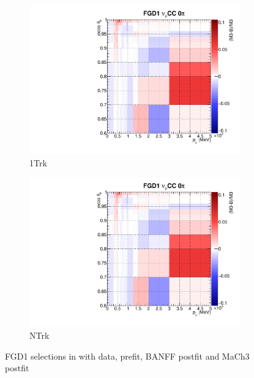 \begin{figure}
\begin{subfigure}[t]{0.24\textwidth}
		\includegraphics[width=\textwidth, trim={0mm 0mm 10mm 7mm}, clip, page=33]{figures/mach3/banff/postfit_comp}
		\caption{\numu 1Trk}
	\end{subfigure}
	\begin{subfigure}[t]{0.24\textwidth}
		\includegraphics[width=\textwidth, trim={0mm 0mm 10mm 7mm}, clip, page=36]{figures/mach3/banff/postfit_comp}
		\caption{\numu NTrk}
	\end{subfigure}
	\caption{FGD1 selections in \pmu with data, prefit, BANFF postfit and MaCh3 postfit}
	\label{fig:mach3_banff_postfit_fgd1}
\end{figure}

